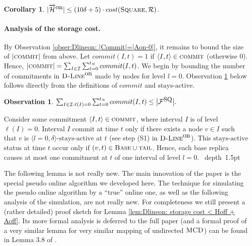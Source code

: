 \documentclass[11pt]{article}
\newtheorem{corollary}[theorem]{Corollary}
\newtheorem{observation}[theorem]{Observation}
\def\proof{\par\noindent{\bf Proof:~}}
\def\blackslug{\hbox{\hskip 1pt \vrule width 4pt height 8pt
    depth 1.5pt \hskip 1pt}}
\def\QED{\quad\blackslug\lower 8.5pt\null\par}
\newcommand{\MCD}{\mbox{\sc MCD}}
\newcommand{\commit}[0]{commit}
\newcommand{\stayactive}[0]{\mbox{stays-active}}
\newcommand{\lfun}[1]{\ell(#1)}
\newcommand{\cost}[0]{cost}
\newcommand{\calH}{\mathcal{H}}
\newcommand{\calI}{\mathcal{I}}
\newcommand{\calF}{\mathcal{F}}
\newcommand{\calR}{\mathcal{R}}
\newcommand{\DBase}[0]{{\mbox{\sc Base}}}
\newcommand{\Square}[0]{\mbox{\sc Square}}
\newcommand{\NN}{N}
\newcommand{\Dlineon}[0]{\mbox{{\sc D-Line}}^{\mbox{\upshape on}}}
\newcommand{\tail}[0]{\mbox{\sc tail}}
\newcommand{\FSQ}[0]{\calF^{\mbox{\small\upshape SQ}}}
\newcommand{\HDon}[0]{\overrightarrow{\calH}^{\mbox{\upshape on}}}
\newcommand{\DCOMMIT}[0]{\mbox{\sc commit}}
\newcommand{\Dcommit}[0]{commit}
\begin{document}
\begin{corollary}
$|\HDon|\leq (10\delta+5)\cdot \cost(\Square,\calR)$.
\label{corollary:Dlineon: delivery cost}
\end{corollary}


\vspace{-0.3cm}
\paragraph*{\bf Analysis of the storage cost\commsingle.\commsingleend}



By Observation \ref{obser:Dlineon: |Commit|=|Aon-0|},
it remains to bound the size of $|\DCOMMIT|$ from above.
Let $\Dcommit(I,t)=1$ if $\langle I,t\rangle\in\DCOMMIT$ (otherwise 0).
Hence,
$|\DCOMMIT|=
\sum_{I\in \calI}\sum_{t=0}^{t_\NN}\Dcommit(I,t)
$.
We begin by bounding the number of commitments in $\Dlineon$ made by nodes for level $l=0$.
Observation \ref{obser:Dlineon Base acounts level l=0 committments} below follows directly from the definitions of $\commit$ and $\stayactive$.

\vspace{0.2cm}
\begin{observation}
$\sum_{I\in \calI:\lfun{I}=0}\sum_{t=0}^{t_\NN} \Dcommit(I,t)\leq\big|\FSQ\big|.$
\label{obser:Dlineon Base acounts level l=0 committments}
\end{observation}
\proof
Consider some commitment $\langle I,t\rangle\in\DCOMMIT$, where interval $I$ is of level $\lfun{I}=0$.
Interval $I$ commit at time $t$ only if there exists a node $v\in I$ such that $v$ is $\langle l=0,\delta\rangle$-$\stayactive$ at $t$ (see step (S1) in $\Dlineon$).
This $\stayactive$ status at time $t$ occur only if $(v,t)\in\DBase\cup\tail$.
Hence, each base replica causes at most one commitment at $t$ of one interval of level $l=0$.
\QED


The following lemma is not really new.
The main innovation of the paper is the special pseudo online algorithm we developed here.
The technique for simulating the pseudo online algorithm by a ``true'' online one, as well as the following
analysis of the simulation, are not really new.
For completeness we still present a (rather detailed) proof sketch for Lemma \ref{lem:Dlineon: storage cost < Hoff + Aoff}.
Its more formal analysis is deferred to the full paper
(and a formal proof of a very similar lemma for very similar mapping of undirected $\MCD$)
can be found in Lemma 3.8 of \cite{KK2014TR}.
\end{document}
